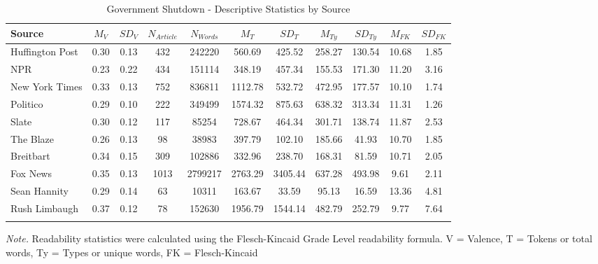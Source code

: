 \documentclass[
  man,floatsintext]{apa6}
\begin{document}
\begin{table}[h]

\begin{center}
\begin{threeparttable}

\caption{\label{tab:exp2-source-descriptives-gs}Government Shutdown - Descriptive Statistics by Source}

\footnotesize{

\begin{tabular}{lcccccccccc}
\toprule
Source & $M_V$ & $SD_V$ & $N_{Article}$ & $N_{Words}$ & $M_T$ & $SD_T$ & $M_{Ty}$ & $SD_{Ty}$ & $M_{FK}$ & $SD_{FK}$\\
\midrule
Huffington Post & 0.30 & 0.13 & 432 & 242220 & 560.69 & 425.52 & 258.27 & 130.54 & 10.68 & 1.85\\
NPR & 0.23 & 0.22 & 434 & 151114 & 348.19 & 457.34 & 155.53 & 171.30 & 11.20 & 3.16\\
New York Times & 0.33 & 0.13 & 752 & 836811 & 1112.78 & 532.72 & 472.95 & 177.57 & 10.10 & 1.74\\
Politico & 0.29 & 0.10 & 222 & 349499 & 1574.32 & 875.63 & 638.32 & 313.34 & 11.31 & 1.26\\
Slate & 0.30 & 0.12 & 117 & 85254 & 728.67 & 464.34 & 301.71 & 138.74 & 11.87 & 2.53\\
The Blaze & 0.26 & 0.13 & 98 & 38983 & 397.79 & 102.10 & 185.66 & 41.93 & 10.70 & 1.85\\
Breitbart & 0.34 & 0.15 & 309 & 102886 & 332.96 & 238.70 & 168.31 & 81.59 & 10.71 & 2.05\\
Fox News & 0.35 & 0.13 & 1013 & 2799217 & 2763.29 & 3405.44 & 637.28 & 493.98 & 9.61 & 2.11\\
Sean Hannity & 0.29 & 0.14 & 63 & 10311 & 163.67 & 33.59 & 95.13 & 16.59 & 13.36 & 4.81\\
Rush Limbaugh & 0.37 & 0.12 & 78 & 152630 & 1956.79 & 1544.14 & 482.79 & 252.79 & 9.77 & 7.64\\
\bottomrule
\addlinespace
\end{tabular}

}

\begin{tablenotes}[para]
\normalsize{\textit{Note.} Readability statistics were calculated using the Flesch-Kincaid Grade Level readability formula. V = Valence, T = Tokens or total words, Ty = Types or unique words, FK = Flesch-Kincaid}
\end{tablenotes}

\end{threeparttable}
\end{center}

\end{table}
\end{document}
